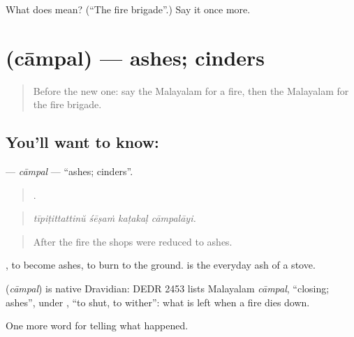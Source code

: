 \begin{tcolorbox}[breakable,colback=teal!4,colframe=teal!35!black,title={Before you move on}]
What does  mean? (\textquotedblleft{}The fire brigade\textquotedblright{}.) Say it once more.
\end{tcolorbox}
\section[\texorpdfstring{\ml{ചാമ്പൽ} (cāmpal)}{ചാമ്പൽ (cāmpal)}]{ (cāmpal) — ashes; cinders}

\label{lesson:ML-C362-campal}



\begin{quote}
Before the new one: say the Malayalam for a fire, then the Malayalam for the fire brigade.
\end{quote}

\subsection*{You'll want to know: }
\textbf{} — \emph{cāmpal} — \textquotedblleft{}ashes; cinders\textquotedblright{}.

\begin{quote}
   .
\end{quote}

\begin{quote}
\emph{tīpiṭittattinŭ śēṣaṁ kaṭakaḷ cāmpalāyi.}
\end{quote}

\begin{quote}
After the fire the shops were reduced to ashes.
\end{quote}

, to become ashes, to burn to the ground.  is the everyday ash of a stove.

\begin{cousinweb}
\textbf{} (\emph{cāmpal}) is native Dravidian: DEDR 2453 lists Malayalam \emph{cāmpal}, \textquotedblleft{}closing; ashes\textquotedblright{}, under , \textquotedblleft{}to shut, to wither\textquotedblright{}: what is left when a fire dies down.
\end{cousinweb}

\begin{grammarlens}[title={What you've built}]
One more word for telling what happened.
\end{grammarlens}

